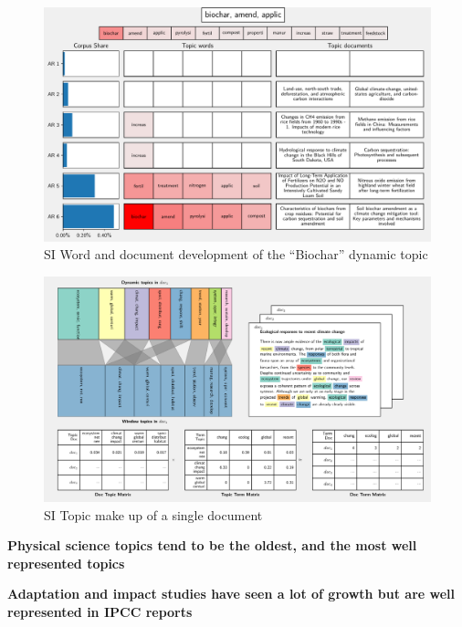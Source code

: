 \documentclass{article}
\begin{document}
\begin{linenumbers}
\begin{figure}
	\begin{center}
		\includegraphics[width=1\linewidth]{plots/single_topic_3_11020.pdf}
		\caption{SI Word and document development of the ``Biochar'' dynamic topic}
		\label{}
	\end{center}
\end{figure}


\begin{figure}
\begin{center}
	\includegraphics[width=1\linewidth]{plots/single_doc_3_536594.pdf}
    \caption{SI Topic make up of a single document}
    \label{}
    \end{center}
\end{figure}

\bigskip
\noindent\textbf{Physical science topics tend to be the oldest, and the most well represented topics}

\bigskip
\noindent\textbf{Adaptation and impact studies have seen a lot of growth but are well represented in IPCC reports}


\end{linenumbers}
\end{document}
